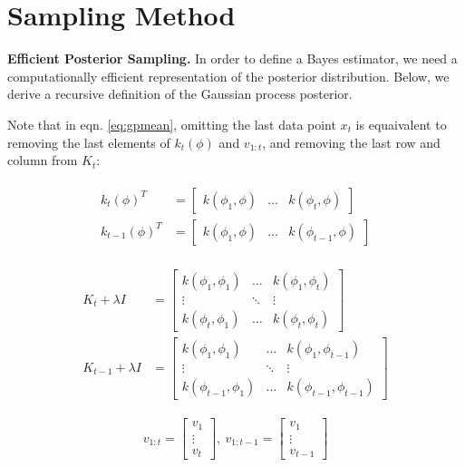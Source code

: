 \documentclass[12pt, conference]{IEEEtran}
\begin{document}
\section{Sampling Method}

\noindent\textbf{Efficient Posterior Sampling.} In order to define a Bayes estimator, we need a computationally efficient representation of the posterior distribution. Below, we derive a recursive definition of the Gaussian process posterior.

Note that in eqn. \ref{eq:gpmean}, omitting the last data point $x_t$ is equaivalent to removing the last elements of $k_t(\phi)$ and $v_{1:t}$, and removing the last row and column from $K_t$:


\begin{align}
\begin{split}
    k_t(\phi)^T &= 
    \begin{bmatrix}
        k(\phi_1,\phi)&\hdots&k(\phi_t,\phi)
    \end{bmatrix}
    \\
    k_{t-1}(\phi)^T &= 
    \begin{bmatrix}
        k(\phi_1,\phi)&\hdots&k(\phi_{t-1},\phi)
    \end{bmatrix}
    \label{eq:tstepk}
\end{split}
\end{align}

\begin{align}
\begin{split}
    K_t+\lambda I &= 
    \begin{bmatrix}
        k(\phi_1,\phi_1)&\hdots&k(\phi_1,\phi_t) \\
        \vdots & \ddots & \vdots \\
        k(\phi_t,\phi_1)&\hdots&k(\phi_t,\phi_t)
    \end{bmatrix}
    \\
    K_{t-1}+\lambda I &= 
    \begin{bmatrix}
        k(\phi_1,\phi_1)&\hdots&k(\phi_1,\phi_{t-1}) \\
        \vdots & \ddots & \vdots \\
        k(\phi_{t-1},\phi_1)&\hdots&k(\phi_{t-1},\phi_{t-1})
    \end{bmatrix}
    \label{eq:tstepK}
\end{split}
\end{align}

\begin{equation}
    v_{1:t} = 
    \begin{bmatrix}
        v_1 \\
        \vdots \\
        v_t
    \end{bmatrix}
    ,\ 
    v_{1:t-1} = 
    \begin{bmatrix}
        v_1 \\
        \vdots \\
        v_{t-1}
    \end{bmatrix}
    \label{eq:tstepv}
\end{equation}
\smallskip
\end{document}
